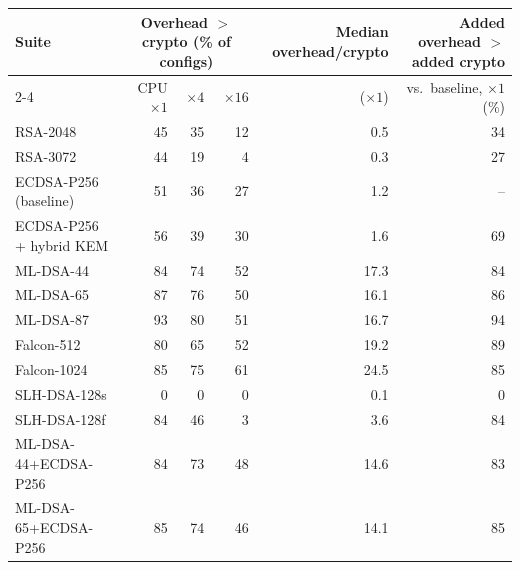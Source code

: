 \begin{tabular}{@{}lrrrrr@{}}
\toprule
Suite & \multicolumn{3}{c}{Overhead $>$ crypto (\% of configs)} & Median overhead/crypto & Added overhead $>$ added crypto \\
\cmidrule(lr){2-4}
 & CPU $\times1$ & $\times4$ & $\times16$ & ($\times1$) & vs.\ baseline, $\times1$ (\%) \\
\midrule
RSA-2048 & 45 & 35 & 12 & 0.5 & 34 \\
RSA-3072 & 44 & 19 & 4 & 0.3 & 27 \\
ECDSA-P256 (baseline) & 51 & 36 & 27 & 1.2 & -- \\
ECDSA-P256 + hybrid KEM & 56 & 39 & 30 & 1.6 & 69 \\
ML-DSA-44 & 84 & 74 & 52 & 17.3 & 84 \\
ML-DSA-65 & 87 & 76 & 50 & 16.1 & 86 \\
ML-DSA-87 & 93 & 80 & 51 & 16.7 & 94 \\
Falcon-512 & 80 & 65 & 52 & 19.2 & 89 \\
Falcon-1024 & 85 & 75 & 61 & 24.5 & 85 \\
SLH-DSA-128s & 0 & 0 & 0 & 0.1 & 0 \\
SLH-DSA-128f & 84 & 46 & 3 & 3.6 & 84 \\
ML-DSA-44+ECDSA-P256 & 84 & 73 & 48 & 14.6 & 83 \\
ML-DSA-65+ECDSA-P256 & 85 & 74 & 46 & 14.1 & 85 \\
\bottomrule
\end{tabular}
